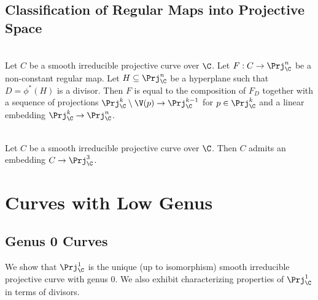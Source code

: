 \documentclass[a4paper]{article}
\begin{document}
\subsection{Classification of Regular Maps into Projective Space}
\begin{thm}{}{}\\
Let $C$ be a smooth irreducible projective curve over $\C$. Let $F:C\to\Prj_\C^n$ be a non-constant regular map. Let $H\subseteq\Prj_\C^n$ be a hyperplane such that $D=\phi^\ast(H)$ is a divisor. Then $F$ is equal to the composition of $F_D$ together with a sequence of projections $\Prj_\C^k\setminus\V(p)\to\Prj_\C^{k-1}$ for $p\in\Prj_\C^k$ and a linear embedding $\Prj_\C^k\to\Prj_\C^n$. 
\end{thm}

\begin{thm}{}{}\\
Let $C$ be a smooth irreducible projective curve over $\C$. Then $C$ admits an embedding $C\to\Prj_\C^3$. 
\end{thm}

\pagebreak
\section{Curves with Low Genus}
\subsection{Genus 0 Curves}
We show that $\Prj_\C^1$ is the unique (up to isomorphism) smooth irreducible projective curve with genus $0$. We also exhibit characterizing properties of $\Prj_\C^1$ in terms of divisors. 
\end{document}
